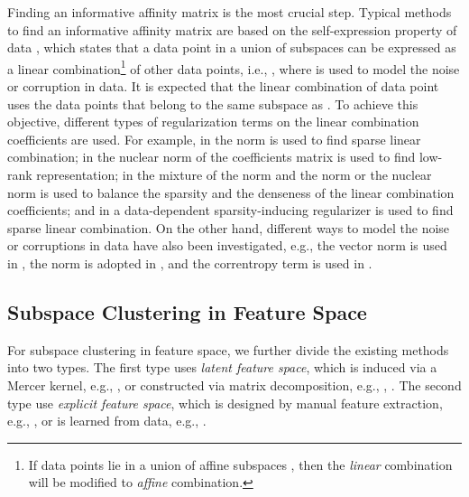 \documentclass[10pt,twocolumn,letterpaper]{article}
\def\ie{i.e.}
\def\eg{e.g.}
\def\ie{i.e.}
\def\eg{e.g.}
\begin{document}
Finding an informative affinity matrix is the most crucial step. Typical methods to find an informative affinity matrix are based on the self-expression property of data \cite{Elham:CVPR09, Vidal:Springer16}, which states that a data point in a union of subspaces can be expressed as a linear combination\footnote{If data points lie in a union of affine subspaces \cite{Li:JSTSP18}, then the {\em linear} combination will be modified to {\em affine} combination.} of other data points, \ie, , where  is used to model the noise or corruption in data. It is expected that the linear combination of data point  uses the data points that belong to the same subspace as . To achieve this objective, different types of regularization terms on the linear combination coefficients are used. For example, in \cite{Elham:CVPR09} the  norm is used to find sparse linear combination; in \cite{Liu:ICML10} the nuclear norm of the coefficients matrix is used to find low-rank representation; in \cite{Wang:NIPS13-LRR+SSC, You:CVPR16-EnSC} the mixture of the  norm and the  norm or the nuclear norm is used to balance the sparsity and the denseness of the linear combination coefficients; and in \cite{Xin:TSP18} a data-dependent sparsity-inducing regularizer is used to find sparse linear combination. On the other hand, different ways to model the noise or corruptions in data have also been investigated, \eg, the vector  norm is used in \cite{Elham:CVPR09}, the  norm is adopted in \cite{Liu:ICML10}, and the correntropy term is used in \cite{He:TNNLS16}.



\subsection{Subspace Clustering in Feature Space}

For subspace clustering in feature space, we further divide the existing methods into two types. The first type uses \emph{latent feature space}, which is induced via a Mercer kernel, \eg, \cite{Patel:ICIP14, Patel:JSTSP15, Ngu:Neuc15, Xiao:TNNLS16}, or constructed via matrix decomposition, \eg, \cite{Liu:ICCV11}, \cite{Patel:ICCV13}. The second type use \emph{explicit feature space}, which is designed by manual feature extraction, \eg, \cite{Peng:IJCAI16}, or is learned from data, \eg, \cite{Ji:NIPS17, Zhou:CVPR18}.
\end{document}
